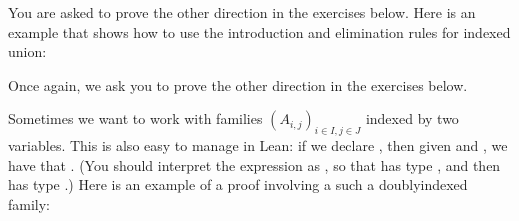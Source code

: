 \documentclass[letterpaper,10pt,english]{sphinxmanual}
\begin{document}
\sphinxAtStartPar
You are asked to prove the other direction in the exercises below.
Here is an example that shows how to use the introduction and elimination rules for indexed union:

\begin{sphinxVerbatim}[commandchars=\\\{\}]
    
                

              
    
           
  
  
         
        
         
            
            
\end{sphinxVerbatim}

\sphinxAtStartPar
Once again, we ask you to prove the other direction in the exercises below.

\sphinxAtStartPar
Sometimes we want to work with families \((A_{i, j})_{i \in I, j \in J}\)
indexed by two variables.
This is also easy to manage in Lean: if we declare ,
then given  and ,
we have that .
(You should interpret the expression  as
,
so that  has type ,
and then  has type .)
Here is an example of a proof involving a such a doubly\sphinxhyphen{}indexed family:
\end{document}
